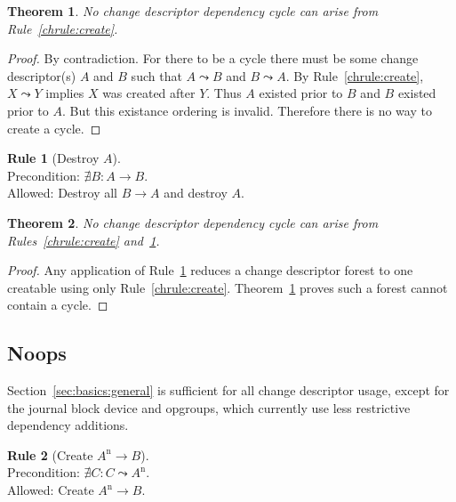 \documentclass{article}
\newtheorem{thm}{Theorem}[section]
\theoremstyle{definition}
\newtheorem{chrule}{Rule}[section]
\newcommand{\cd}[1]{\ensuremath{#1}}
\newcommand{\ncd}[1]{\ensuremath{\cd{#1}^\mathrm{n}}}
\newcommand{\depends}[2]{\ensuremath{#1\! \rightarrow\! #2}}
\newcommand{\indirdepends}[2]{\ensuremath{#1\! \leadsto\! #2}}
\begin{document}
\begin{thm}\label{thm:createsafe}
  No change descriptor dependency cycle can arise from
  Rule~\ref{chrule:create}.
\end{thm}
\begin{proof}
  By contradiction.
  For there to be a cycle there must be some change descriptor(s)
  \cd{A} and \cd{B} such that \indirdepends{\cd{A}}{\cd{B}} and
  \indirdepends{\cd{B}}{\cd{A}}.
  By Rule~\ref{chrule:create}, \indirdepends{\cd{X}}{\cd{Y}} implies
  \cd{X} was created after \cd{Y}. Thus \cd{A} existed prior to \cd{B}
  and \cd{B} existed prior to \cd{A}. But this existance ordering is
  invalid.  Therefore there is no way to create a cycle.
\end{proof}

\begin{chrule}[Destroy \cd{A}]\label{chrule:destroy}
  \mbox{}\\
  Precondition: \(\nexists \cd{B}\!: \depends{\cd{A}}{\cd{B}}\).\\
  Allowed: Destroy all \depends{\cd{B}}{\cd{A}} and destroy \cd{A}.
\end{chrule}

\begin{thm}\label{thm:destroysafe}
  No change descriptor dependency cycle can arise from
  Rules~\ref{chrule:create} and~\ref{chrule:destroy}.
\end{thm}
\begin{proof}
  Any application of Rule~\ref{chrule:destroy} reduces a change
  descriptor forest to one creatable using only
  Rule~\ref{chrule:create}. Theorem~\ref{thm:createsafe} proves such
  a forest cannot contain a cycle.
\end{proof}
\subsection{Noops}
\label{sec:basics:noops}

Section~\ref{sec:basics:general} is sufficient for all change descriptor
usage, except for the journal block device and opgroups, which currently
use less restrictive dependency additions.

\begin{chrule}[Create \depends{\ncd{A}}{\cd{B}}]\label{chrule:noop-nc}
  \mbox{}\\
  Precondition: \(\nexists \cd{C}\!: \indirdepends{\cd{C}}{\ncd{A}}\).\\
  Allowed: Create \depends{\ncd{A}}{\cd{B}}.
\end{chrule}
\end{document}

